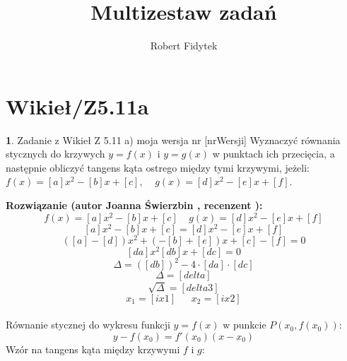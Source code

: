 \documentclass[12pt, a4paper]{article}
\title{Multizestaw zadań}
\author{Robert Fidytek}
\date{}
\theoremstyle{definition} %
\newtheorem{zad}{}
\newcommand{\kategoria}[1]{\section{#1}} %
\newcommand{\zadStart}[1]{\begin{zad}#1\newline} %
\newcommand{\zadStop}{\end{zad}}   %
\newcommand{\rozwStart}[2]{\noindent \textbf{Rozwiązanie (autor #1 , recenzent #2): }\newline} %
\begin{document}
\maketitle


\kategoria{Wikieł/Z5.11a}
\zadStart{Zadanie z Wikieł Z 5.11 a) moja wersja nr [nrWersji]}
Wyznaczyć równania stycznych do krzywych $y=f(x)$ i $y=g(x)$ w punktach ich przecięcia, a następnie obliczyć tangens kąta ostrego między tymi krzywymi, jeżeli:\\
$f(x)=[a]x^2-[b]x+[c], \ \ \ \ \ g(x)=[d]x^2-[e]x+[f]$.
\zadStop
\rozwStart{Joanna Świerzbin}{}
$$f(x)=[a]x^2-[b]x+[c] \ \ \ \ \ g(x)=[d]x^2-[e]x+[f]$$
$$[a]x^2-[b]x+[c]=[d]x^2-[e]x+[f]$$
$$([a]-[d])x^2+(-[b]+[e])x+[c]-[f]=0$$
$$[da]x^2 [db] x+[dc]=0$$
$$\Delta = ([db])^2-4\cdot[da]\cdot[dc]$$
$$\Delta = [delta] $$ 
$$\sqrt{\Delta}=[delta3]$$
$$x_1=[ix1] \ \ \ \ \ \ \ x_2=[ix2]$$
\\
Równanie stycznej do wykresu funkcji $y=f(x)$ w punkcie $P(x_0,f(x_0))$:
$$
y-f(x_0)=f'(x_0)(x-x_0)
$$
Wzór na tangens kąta między krzywymi $f$ i $g$:
\end{document}
